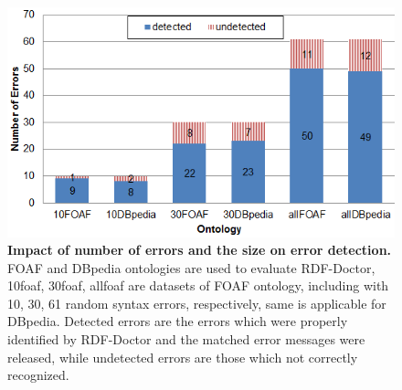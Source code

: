 \begin{figure}[ht]
\begin{center}
		\includegraphics[scale=0.9,angle=0]{images/Experiment03-01.png}
				\setlength\belowcaptionskip{-5mm}
		\caption{\textbf{Impact of number of errors and the size on error detection.} 
		FOAF and DBpedia ontologies are used to evaluate RDF-Doctor, 10foaf, 30foaf, allfoaf are datasets of FOAF ontology, including with 10, 30, 61 random syntax errors, respectively, same is applicable for DBpedia. Detected errors are the errors which were properly identified by RDF-Doctor and the matched error messages were released, while undetected errors are those which not correctly recognized.}
		\label{Fig:Experiment03-01}

\end{center}
\end{figure}


